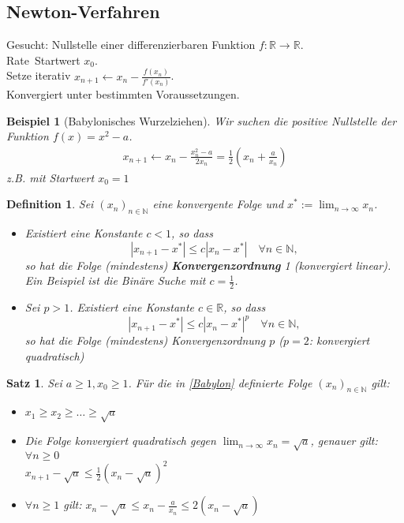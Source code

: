 \documentclass[12pt,a4paper]{article}
\theoremstyle{plain}
\newtheorem{Satz}[Theorem]{Satz}
\newtheorem{Definition}[Theorem]{Definition}
\newtheorem{Beispiel}[Theorem]{Beispiel}
\newcommand{\herv}[1]{{\emph{\textbf{#1}}}}
\newcommand{\N}{\mathbb{N}}
\newcommand{\R}{\mathbb{R}}
\numberwithin{equation}{section}
\begin{document}
\subsection{Newton-Verfahren}
Gesucht: Nullstelle einer differenzierbaren Funktion $f: \R \rightarrow \R$.\\
\glqq Rate\grqq\ Startwert $x_0$. \\
Setze iterativ $x_{n+1}\leftarrow x_n-\frac{f(x_n)}{f'(x_n)}$.\\
Konvergiert unter bestimmten Voraussetzungen.
\begin{Beispiel}[Babylonisches Wurzelziehen]
Wir suchen die positive Nullstelle der Funktion $f(x)=x^2-a$.
\begin{eqnarray}\label{Babylon}
x_{n+1}\leftarrow x_n-\frac{x_n^2-a}{2x_n}=\frac{1}{2}\left(x_n+\frac{a}{x_n}\right) 
\end{eqnarray}
z.B. mit Startwert $x_0=1$
\end{Beispiel} 
\begin{Definition}
Sei $(x_n)_{n\in\N}$ eine konvergente Folge und $x^*:=\lim_{n\rightarrow \infty} x_n$.\\
\begin{itemize}
\item Existiert eine Konstante $c<1$, so dass 
\[ |x_{n+1}-x^*|\leq c|x_n-x^*| \quad \forall n\in \N,\]
so hat die Folge (mindestens) \herv{Konvergenzordnung} 1 (konvergiert linear). Ein Beispiel ist die Binäre Suche mit $c=\frac{1}{2}$.
\item Sei $p>1$. Existiert eine Konstante $c\in \R$, so dass 
\[ |x_{n+1}-x^*|\leq c|x_n-x^*|^p \quad \forall n\in \N,\]
so hat die Folge (mindestens) Konvergenzordnung $p$ ($p=2$: konvergiert quadratisch)
\end{itemize}
\end{Definition}
\begin{Satz}
Sei $a\geq 1, x_0\geq 1$. Für die in \eqref{Babylon} definierte Folge $(x_n)_{n\in\N}$ gilt:
\renewcommand{\labelenumi}{\emph{(\alph{enumi})}}
\begin{itemize}
\item $x_1\geq x_2\geq \ldots\geq\sqrt{a}$
\item Die Folge konvergiert quadratisch gegen $\lim_{n\rightarrow \infty} x_n = \sqrt{a}$, genauer gilt: $\forall n\geq 0$\\ $x_{n+1}-\sqrt{a}\leq\frac{1}{2}\left(x_n-\sqrt{a}\right)^2$
\item $\forall n\geq 1$ gilt: $x_n-\sqrt{a}\leq x_n-\frac{a}{x_n}\leq 2\left(x_n-\sqrt{a}\right)$
\end{itemize}
\end{Satz}
\end{document}
